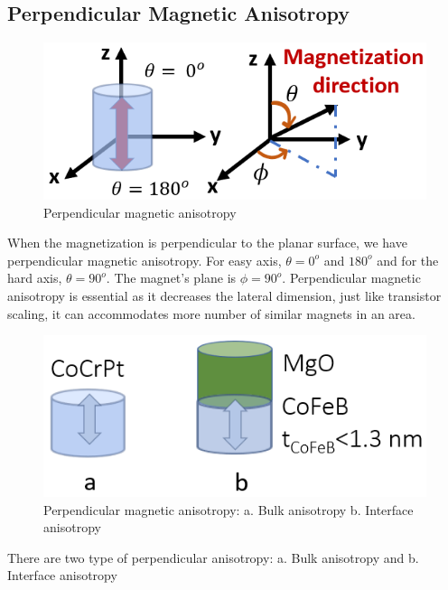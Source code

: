 \subsection{Perpendicular Magnetic Anisotropy}
\begin{figure}[H]
	\centering
   \includegraphics[scale=0.56]{Images/22.png} 
   \caption{Perpendicular magnetic anisotropy}
\end{figure}
When the magnetization is perpendicular to the planar surface, we have perpendicular magnetic anisotropy. For easy axis, $\theta = 0^o$ and $180^o$ and for the hard axis, $\theta = 90^o$.  The magnet's plane is $\phi=90^o$. Perpendicular magnetic anisotropy is essential as it decreases the lateral dimension, just like transistor scaling, it can accommodates more number of similar magnets in an area.
\begin{figure}[H]
	\centering
   \includegraphics[scale=0.56]{Images/23.png} 
   \caption{Perpendicular magnetic anisotropy: a. Bulk anisotropy b. Interface anisotropy}
\end{figure}
There are two type of perpendicular anisotropy: a. Bulk anisotropy and b. Interface anisotropy\\

